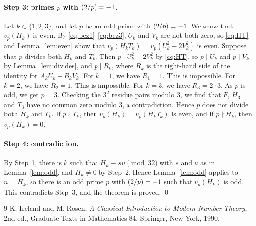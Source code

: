 \documentclass[11pt]{article}
\newcommand{\leg}[2]{\mathchoice{\biggl(\dfrac{#1}{#2}\biggr)}{(#1/#2)}{(#1/#2)}{(#1/#2)}}
\begin{document}
\paragraph{Step 3: primes $p$ with $\leg{2}{p}=-1$.} Let $k\in\{1,2,3\}$, and let $p$ be an odd prime with $\leg{2}{p}=-1$. We show that $v_p(H_k)$ is even. By \eqref{eq:bez1}--\eqref{eq:bez3}, $U_k$ and $V_k$ are not both zero, so \eqref{eq:HT} and Lemma~\ref{lem:even} show that $v_p(H_kT_k)=v_p(U_k^2-2V_k^2)$ is even. Suppose that $p$ divides both $H_k$ and $T_k$. Then $p\mid U_k^2-2V_k^2$ by \eqref{eq:HT}, so $p\mid U_k$ and $p\mid V_k$ by Lemma~\ref{lem:divides}, and $p\mid R_k$, where $R_k$ is the right-hand side of the identity for $A_kU_k+B_kV_k$. For $k=1$, we have $R_{1}=1$. This is impossible. For $k=2$, we have $R_{2}=1$. This is impossible. For $k=3$, we have $R_{3}=2\cdot 3$. As $p$ is odd, we get $p=3$. Checking the $3^2$ residue pairs modulo $3$, we find that $F$, $H_{3}$ and $T_{3}$ have no common zero modulo $3$, a contradiction. Hence $p$ does not divide both $H_k$ and $T_k$. If $p\nmid T_k$, then $v_p(H_k)=v_p(H_kT_k)$ is even, and if $p\nmid H_k$, then $v_p(H_k)=0$.

\paragraph{Step 4: contradiction.} By Step~1, there is $k$ such that $H_k\equiv su\pmod{32}$ with $s$ and $u$ as in Lemma~\ref{lem:odd}, and $H_k\neq0$ by Step~2. Hence Lemma~\ref{lem:odd} applies to $n=H_k$, so there is an odd prime $p$ with $\leg{2}{p}=-1$ such that $v_p(H_k)$ is odd. This contradicts Step~3, and the theorem is proved.
\qed

\begin{thebibliography}{9}
 K. Ireland and M. Rosen, \emph{A Classical Introduction to Modern Number Theory}, 2nd ed., Graduate Texts in Mathematics 84, Springer, New York, 1990.
\end{thebibliography}
\end{document}
